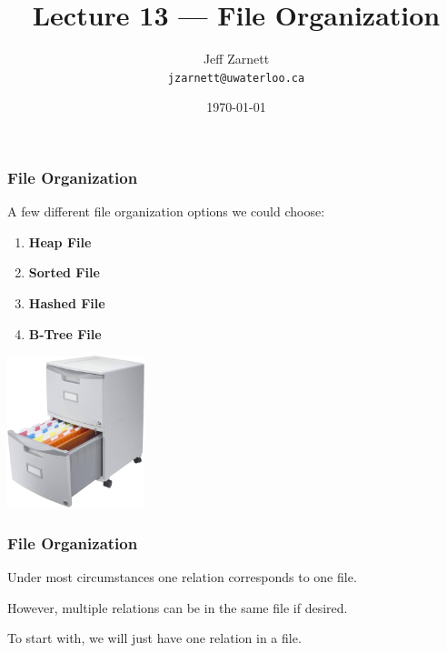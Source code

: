 

\title{Lecture 13 --- File Organization }

\author{Jeff Zarnett \\ \small \texttt{jzarnett@uwaterloo.ca}}
\date{\today}




\begin{frame}
  \titlepage

 \end{frame}
 
 

\begin{frame}
\frametitle{File Organization}

A few different file organization options we could choose: 
\begin{multicols}{2}
\begin{enumerate}
	\item \textbf{Heap File}
	\item \textbf{Sorted File}
	\item \textbf{Hashed File}
	\item \textbf{B-Tree File}
\end{enumerate}
\columnbreak
\begin{center}
	\includegraphics[width=0.3\textwidth]{images/filingcabinet.jpg}
\end{center}
\end{multicols}

\end{frame}



\begin{frame}
\frametitle{File Organization}

Under most circumstances one relation corresponds to one file. 


However, multiple relations can be in the same file if desired. 

To start with, we will just have one relation in a file. 


\end{frame}



